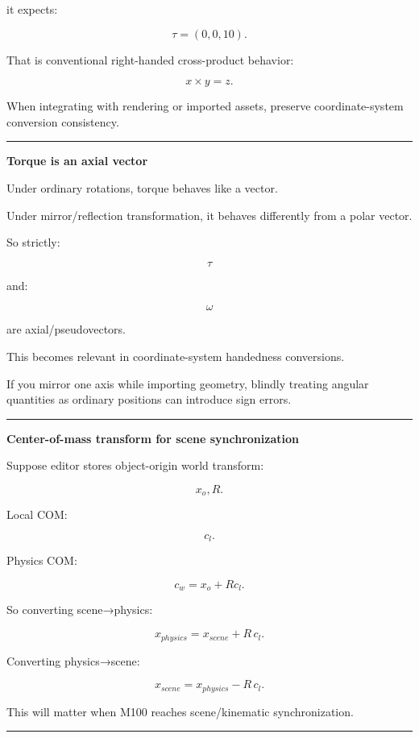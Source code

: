 it expects:

\[
\tau=(0,0,10).
\]

That is conventional right-handed cross-product behavior:

\[
x\times y=z.
\]

When integrating with rendering or imported assets, preserve coordinate-system conversion consistency.

\begin{center}\rule{0.5\linewidth}{0.5pt}\end{center}

\textbf{Torque is an axial vector}

Under ordinary rotations, torque behaves like a vector.

Under mirror/reflection transformation, it behaves differently from a polar vector.

So strictly:

\[
\tau
\]

and:

\[
\omega
\]

are axial/pseudovectors.

This becomes relevant in coordinate-system handedness conversions.

If you mirror one axis while importing geometry, blindly treating angular quantities as ordinary positions can introduce sign errors.

\begin{center}\rule{0.5\linewidth}{0.5pt}\end{center}

\textbf{Center-of-mass transform for scene synchronization}

Suppose editor stores object-origin world transform:

\[
x_o,R.
\]

Local COM:

\[
c_l.
\]

Physics COM:

\[
c_w
=
x_o+
Rc_l.
\]

So converting scene→physics:

\[
\boxed{
x_{physics}
=
x_{scene}
+
R\,c_l.
}
\]

Converting physics→scene:

\[
\boxed{
x_{scene}
=
x_{physics}
-
R\,c_l.
}
\]

This will matter when M100 reaches scene/kinematic synchronization.

\begin{center}\rule{0.5\linewidth}{0.5pt}\end{center}

